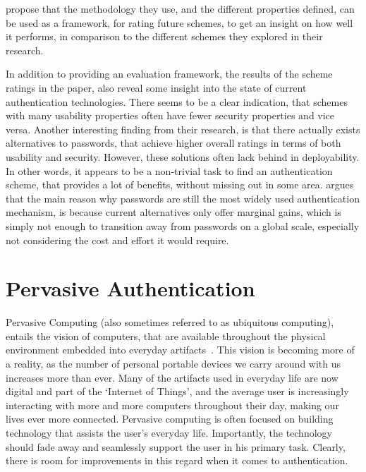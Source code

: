 \citet{bonneau2012quest} propose that the methodology they use, and the different properties defined, can be used as a framework, for rating future schemes, to get an insight on how well it performs, in comparison to the different schemes they explored in their research.


In addition to providing an evaluation framework, the results of the scheme ratings in the paper, also reveal some insight into the state of current authentication technologies.
There seems to be a clear indication, that schemes with many usability properties often have fewer security properties and vice versa.
Another interesting finding from their research, is that there actually exists alternatives to passwords, that achieve higher overall ratings in terms of both usability and security.
However, these solutions often lack behind in deployability.
In other words, it appears to be a non-trivial task to find an authentication scheme, that provides a lot of benefits, without missing out in some area.
\citet{bonneau2012quest} argues that the main reason why passwords are still the most widely used authentication mechanism, is because current alternatives only offer marginal gains, which is simply not enough to transition away from passwords on a global scale, especially not considering the cost and effort it would require.


\section{Pervasive Authentication}

Pervasive Computing (also sometimes referred to as ubiquitous computing), entails the vision of computers, that are available throughout the physical environment embedded into everyday artifacts~\cite{weiser1991computer}.
This vision is becoming more of a reality, as the number of personal portable devices we carry around with us increases more than ever.
Many of the artifacts used in everyday life are now digital and part of the `Internet of Things', and the average user is increasingly interacting with more and more computers throughout their day, making our lives ever more connected.
Pervasive computing is often focused on building technology that assists the user's everyday life.
Importantly, the technology should fade away and seamlessly support the user in his primary task.
Clearly, there is room for improvements in this regard when it comes to authentication.


